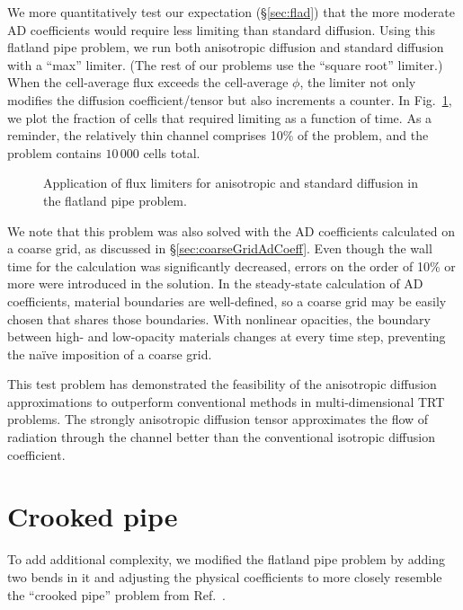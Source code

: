 We more quantitatively test our expectation (\S\ref{sec:flad}) that the more
moderate AD coefficients would require less limiting than standard diffusion.
Using this flatland pipe problem, we run both anisotropic diffusion and
standard diffusion with a ``max'' limiter. (The rest of our problems use the
``square root'' limiter.) When the cell-average flux exceeds the cell-average
$\phi$, the limiter not only modifies the diffusion coefficient/tensor but also
increments a counter. In Fig.~\ref{fig:crashaltFld}, we plot the fraction of
cells that required limiting as a function of time. As a reminder, the
relatively thin channel comprises 10\% of the problem, and the problem contains
$10\,000$ cells total.
\begin{figure}[htb]
  \centering\small
  
  \caption{Application of flux limiters for anisotropic and standard diffusion
  in the flatland pipe problem.}
  \label{fig:crashaltFld}
\end{figure}


We note that this problem was also solved with the AD coefficients calculated on
a coarse grid, as discussed in \S\ref{sec:coarseGridAdCoeff}. Even though the
wall time for the calculation was significantly decreased, errors on the order
of 10\% or more were introduced in the solution. In the steady-state calculation
of AD coefficients, material boundaries are well-defined, so a coarse grid may
be easily chosen that shares those boundaries. With nonlinear opacities, the
boundary between high- and low-opacity materials changes at every time step,
preventing the na\"ive imposition of a coarse grid.

This test problem has demonstrated the feasibility of the anisotropic diffusion
approximations to outperform conventional methods in multi-dimensional
TRT problems. The strongly anisotropic diffusion tensor approximates the flow of
radiation through the channel better than the conventional isotropic diffusion
coefficient.

\clearpage
\section{Crooked pipe}

To add additional complexity, we modified the flatland pipe problem by adding
two bends in it and adjusting the physical coefficients to more closely resemble
the ``crooked pipe'' problem from Ref.~\cite{Gen2001}.

